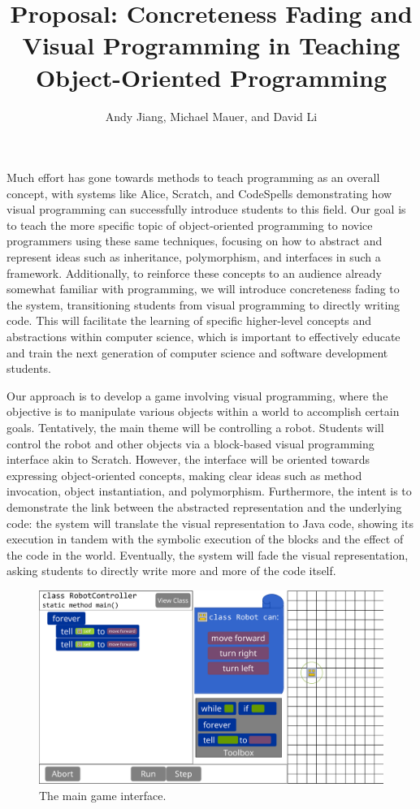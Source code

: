 \documentclass[12pt,notitlepage]{article}
\begin{document}
\title{Proposal: Concreteness Fading and Visual Programming in
  Teaching Object-Oriented Programming}
\author{Andy Jiang, Michael Mauer, and David Li}

\maketitle

Much effort has gone towards methods to teach programming as an
overall concept, with systems like Alice, Scratch, and CodeSpells
demonstrating how visual programming can successfully introduce
students to this field. Our goal is to teach the more specific topic
of object-oriented programming to novice programmers using these same
techniques, focusing on how to abstract and represent ideas such as
inheritance, polymorphism, and interfaces in such a
framework. Additionally, to reinforce these concepts to an audience
already somewhat familiar with programming, we will introduce
concreteness fading to the system, transitioning students from visual
programming to directly writing code. This will facilitate the
learning of specific higher-level concepts and abstractions within
computer science, which is important to effectively educate and train
the next generation of computer science and software development
students.

Our approach is to develop a game involving visual programming, where
the objective is to manipulate various objects within a world to
accomplish certain goals. Tentatively, the main theme will be
controlling a robot. Students will control the robot and other objects
via a block-based visual programming interface akin to
Scratch. However, the interface will be oriented towards expressing
object-oriented concepts, making clear ideas such as method
invocation, object instantiation, and polymorphism. Furthermore, the
intent is to demonstrate the link between the abstracted
representation and the underlying code: the system will translate the
visual representation to Java code, showing its execution in tandem
with the symbolic execution of the blocks and the effect of the code
in the world. Eventually, the system will fade the visual
representation, asking students to directly write more and more of the
code itself.

\begin{figure}[h]
  \centering
  \includegraphics[width=\textwidth]{mockup.pdf}
  \caption{The main game interface.}
\end{figure}
\end{document}
